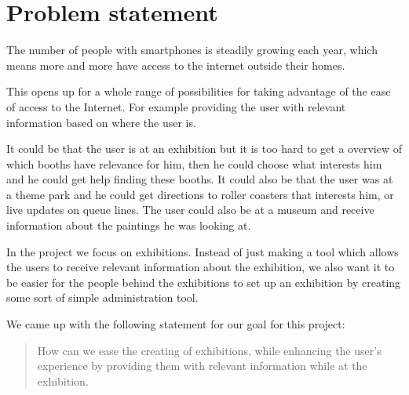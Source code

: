 \section{Problem statement}

The number of people with smartphones is steadily growing each year, which means more and more have access to the internet outside their homes.

This opens up for a whole range of possibilities for taking advantage of the ease of access to the Internet. For example providing the user with relevant information based on where the user is. 

It could be that the user is at an exhibition but it is too hard to get a overview of which booths have relevance for him, then he could choose what interests him and he could get help finding these booths. It could also be that the user was at a theme park and he could get directions to roller coasters that interests him, or live updates on queue lines. The user could also be at a museum and receive information about the paintings he was looking at.  

In the project we focus on exhibitions. Instead of just making a tool which allows the users to receive relevant information about the exhibition, we also want it to be easier for the people behind the exhibitions to set up an exhibition by creating some sort of simple administration tool.

We came up with the following statement for our goal for this project:

\begin{quote}
How can we ease the creating of exhibitions, while enhancing the user's experience by providing them with relevant information while at the exhibition.
\end{quote}

